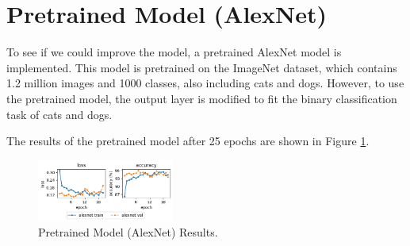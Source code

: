 \section{Pretrained Model (AlexNet)}
To see if we could improve the model, a pretrained AlexNet model is implemented.
This model is pretrained on the ImageNet dataset, which contains 1.2 million images and 1000 classes, also including cats and dogs.
However, to use the pretrained model, the output layer is modified to fit the binary classification task of cats and dogs.

The results of the pretrained model after 25 epochs are shown in Figure \ref{fig:pretrained_model_results}.

\begin{figure}[H]
    \vspace*{-0.7cm}
    \centering
    \includegraphics[width=0.4\textwidth]{figures/results_alexnet.png}
    \caption{Pretrained Model (AlexNet) Results.}
    \label{fig:pretrained_model_results}
    \vspace*{-0.7cm}
\end{figure}
